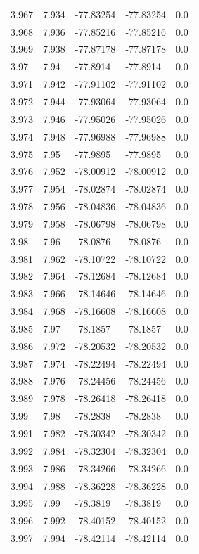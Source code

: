 \begin{tabular}{lllll}
3.967 & 7.934 & -77.83254 & -77.83254 & 0.0 \\
3.968 & 7.936 & -77.85216 & -77.85216 & 0.0 \\
3.969 & 7.938 & -77.87178 & -77.87178 & 0.0 \\
3.97 & 7.94 & -77.8914 & -77.8914 & 0.0 \\
3.971 & 7.942 & -77.91102 & -77.91102 & 0.0 \\
3.972 & 7.944 & -77.93064 & -77.93064 & 0.0 \\
3.973 & 7.946 & -77.95026 & -77.95026 & 0.0 \\
3.974 & 7.948 & -77.96988 & -77.96988 & 0.0 \\
3.975 & 7.95 & -77.9895 & -77.9895 & 0.0 \\
3.976 & 7.952 & -78.00912 & -78.00912 & 0.0 \\
3.977 & 7.954 & -78.02874 & -78.02874 & 0.0 \\
3.978 & 7.956 & -78.04836 & -78.04836 & 0.0 \\
3.979 & 7.958 & -78.06798 & -78.06798 & 0.0 \\
3.98 & 7.96 & -78.0876 & -78.0876 & 0.0 \\
3.981 & 7.962 & -78.10722 & -78.10722 & 0.0 \\
3.982 & 7.964 & -78.12684 & -78.12684 & 0.0 \\
3.983 & 7.966 & -78.14646 & -78.14646 & 0.0 \\
3.984 & 7.968 & -78.16608 & -78.16608 & 0.0 \\
3.985 & 7.97 & -78.1857 & -78.1857 & 0.0 \\
3.986 & 7.972 & -78.20532 & -78.20532 & 0.0 \\
3.987 & 7.974 & -78.22494 & -78.22494 & 0.0 \\
3.988 & 7.976 & -78.24456 & -78.24456 & 0.0 \\
3.989 & 7.978 & -78.26418 & -78.26418 & 0.0 \\
3.99 & 7.98 & -78.2838 & -78.2838 & 0.0 \\
3.991 & 7.982 & -78.30342 & -78.30342 & 0.0 \\
3.992 & 7.984 & -78.32304 & -78.32304 & 0.0 \\
3.993 & 7.986 & -78.34266 & -78.34266 & 0.0 \\
3.994 & 7.988 & -78.36228 & -78.36228 & 0.0 \\
3.995 & 7.99 & -78.3819 & -78.3819 & 0.0 \\
3.996 & 7.992 & -78.40152 & -78.40152 & 0.0 \\
3.997 & 7.994 & -78.42114 & -78.42114 & 0.0 \\

\end{tabular}
